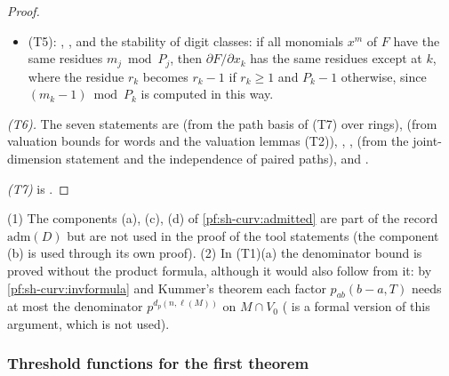 \begin{proof}
\begin{itemize}
\item (T5): ,
, and the stability of digit classes: if all
monomials $x^m$ of $F$ have the same residues $m_j\bmod P_j$, then $\partial F/\partial x_k$ has the same residues except at
$k$, where the residue $r_k$ becomes $r_k-1$ if $r_k\ge1$ and $P_k-1$ otherwise, since $(m_k-1)\bmod P_k$ is computed in this
way.
\end{itemize}
\emph{(T6).} The seven statements are
 (from the path basis of (T7) over
rings),  (from valuation bounds for words and
the valuation lemmas (T2)), ,
,
 (from the joint-dimension statement and the
independence of paired paths),  and
.

\emph{(T7)} is .
\end{proof}

\begin{remark}\label{pf:sh-curv:tools-rem}
(1) The components (a), (c), (d) of \cref{pf:sh-curv:admitted} are part of the record $\mathrm{adm}(D)$ but are not used in
the proof of the tool statements (the component (b) is used through its own proof). (2) In (T1)(a) the denominator bound
is proved without the product formula, although it would also follow from it: by \cref{pf:sh-curv:invformula} and
Kummer's theorem each factor $p_{ab}(b-a,T)$ needs at most the denominator $p^{d_p(n,\ell(M))}$ on $M\cap V_0$
( is a formal version of this argument,
which is not used).
\end{remark}

\subsubsection{Threshold functions for the first theorem}

